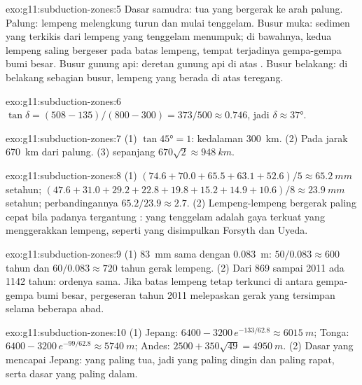 \begin{solution}{exo:g11:subduction-zones:5}
Dasar samudra:  tua yang bergerak ke arah palung. Palung: lempeng
melengkung turun dan mulai tenggelam. Busur muka: sedimen yang terkikis dari
lempeng yang tenggelam menumpuk; di bawahnya, kedua lempeng saling bergeser pada
batas lempeng, tempat terjadinya gempa-gempa bumi besar. Busur gunung api:
deretan gunung api di atas . Busur belakang: di belakang sebagian busur,
lempeng yang berada di atas teregang.
\end{solution}

\begin{solution}{exo:g11:subduction-zones:6}
$\tan\delta = (508 - 135)/(800 - 300) = 373/500 \approx 0.746$, jadi
$\delta \approx \ang{37}$.
\end{solution}

\begin{solution}{exo:g11:subduction-zones:7}
(1) $\tan\ang{45} = 1$: kedalaman \qty{300}{km}. (2) Pada jarak \qty{670}{km}
dari palung. (3)  sepanjang $670\sqrt{2} \approx \qty{948}{km}$.
\end{solution}

\begin{solution}{exo:g11:subduction-zones:8}
(1) $(74.6 + 70.0 + 65.5 + 63.1 + 52.6)/5 \approx \qty{65.2}{mm}$ setahun;
$(47.6 + 31.0 + 29.2 + 22.8 + 19.8 + 15.2 + 14.9 + 10.6)/8 \approx
\qty{23.9}{mm}$ setahun; perbandingannya $65.2/23.9 \approx 2.7$.
(2) Lempeng-lempeng bergerak paling cepat bila padanya tergantung :
 yang tenggelam adalah gaya terkuat yang menggerakkan lempeng,
seperti yang disimpulkan Forsyth dan Uyeda.
\end{solution}

\begin{solution}{exo:g11:subduction-zones:9}
(1) \qty{83}{mm} sama dengan \qty{0.083}{m}: $50/0.083 \approx 600$ tahun dan
$60/0.083 \approx 720$ tahun gerak lempeng. (2) Dari 869 sampai 2011 ada 1142
tahun: ordenya sama. Jika batas lempeng tetap terkunci di antara gempa-gempa bumi
besar, pergeseran tahun 2011 melepaskan gerak yang tersimpan selama beberapa
abad.
\end{solution}

\begin{solution}{exo:g11:subduction-zones:10}
(1) Jepang: $6400 - 3200\,e^{-133/62.8} \approx \qty{6015}{m}$; Tonga:
$6400 - 3200\,e^{-99/62.8} \approx \qty{5740}{m}$; Andes:
$2500 + 350\sqrt{49} = \qty{4950}{m}$. (2) Dasar yang mencapai Jepang: yang
paling tua, jadi  yang paling dingin dan paling rapat, serta dasar yang
paling dalam.
\end{solution}

